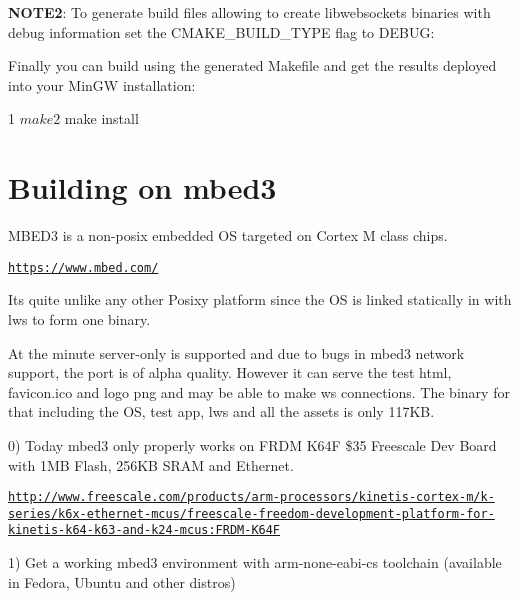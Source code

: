 \begin{DoxyEnumerate}
{\bfseries N\+O\+T\+E2}\+: To generate build files allowing to create libwebsockets binaries with debug information set the C\+M\+A\+K\+E\+\_\+\+B\+U\+I\+L\+D\+\_\+\+T\+Y\+PE flag to D\+E\+B\+UG\+: 

\item Finally you can build using the generated Makefile and get the results deployed into your Min\+GW installation\+:
\end{DoxyEnumerate}


\begin{DoxyCode}
1 $ make
2 $ make install
\end{DoxyCode}
\hypertarget{md_README.build_mbed3}{}\section{Building on mbed3}\label{md_README.build_mbed3}
M\+B\+E\+D3 is a non-\/posix embedded OS targeted on Cortex M class chips.

\href{https://www.mbed.com/}{\tt https\+://www.\+mbed.\+com/}

It\textquotesingle{}s quite unlike any other Posixy platform since the OS is linked statically in with lws to form one binary.

At the minute server-\/only is supported and due to bugs in mbed3 network support, the port is of alpha quality. However it can serve the test html, favicon.\+ico and logo png and may be able to make ws connections. The binary for that including the OS, test app, lws and all the assets is only 117\+KB.

0) Today mbed3 only properly works on F\+R\+DM K64F \$35 Freescale Dev Board with 1\+MB Flash, 256\+KB S\+R\+AM and Ethernet.

\href{http://www.freescale.com/products/arm-processors/kinetis-cortex-m/k-series/k6x-ethernet-mcus/freescale-freedom-development-platform-for-kinetis-k64-k63-and-k24-mcus:FRDM-K64F}{\tt http\+://www.\+freescale.\+com/products/arm-\/processors/kinetis-\/cortex-\/m/k-\/series/k6x-\/ethernet-\/mcus/freescale-\/freedom-\/development-\/platform-\/for-\/kinetis-\/k64-\/k63-\/and-\/k24-\/mcus\+:\+F\+R\+D\+M-\/\+K64F}

1) Get a working mbed3 environment with arm-\/none-\/eabi-\/cs toolchain (available in Fedora, Ubuntu and other distros)


